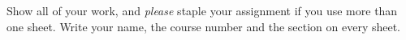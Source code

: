 
\pagestyle{fancy} 
Show all of your work, and \emph{please} staple your assignment if you use more than one sheet. Write your name, the course number and the section on every sheet. 

\begin{enumerate} 






%

\end{enumerate}


